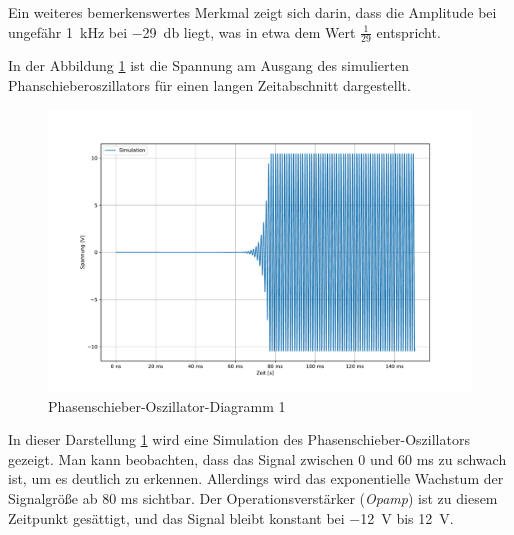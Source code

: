 Ein weiteres bemerkenswertes Merkmal zeigt sich darin, dass die Amplitude bei ungefähr \SI{1}{\kilo\hertz} bei \SI{-29}{\decibel} liegt, was in etwa dem Wert \(\frac{1}{29}\) entspricht.

In der Abbildung \ref{fig:phasenschieberozillator1} ist die Spannung am Ausgang des simulierten Phanschieberoszillators für einen langen Zeitabschnitt dargestellt.

\begin{figure}[H]
  \centering
  \includegraphics[width=\linewidth]{Elektronik-Laborprotokoll_Filter/Plots/phasenschieberozillator1.pdf}
  \caption{Phasenschieber-Oszillator-Diagramm 1}
  \label{fig:phasenschieberozillator1}
\end{figure}

 In dieser Darstellung \ref{fig:phasenschieberozillator1} wird eine Simulation des Phasenschieber-Oszillators gezeigt. Man kann beobachten, dass das Signal zwischen 0 und 60 ms zu schwach ist, um es deutlich zu erkennen. Allerdings wird das exponentielle Wachstum der Signalgröße ab 80 ms sichtbar. Der Operationsverstärker (\textit{Opamp}) ist zu diesem Zeitpunkt gesättigt, und das Signal bleibt konstant bei \SI{-12}{\volt} bis \SI{12}{\volt}. 


